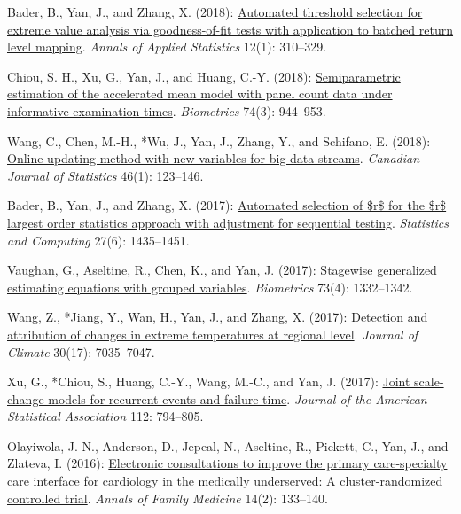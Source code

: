 \begin{RefereedJournalArticles}
\item *Bader, B., Yan, J., and Zhang, X. (2018):
\href{https://doi.org/10.1214/17-AOAS1092}{Automated threshold selection
for extreme value analysis via goodness-of-fit tests with application to
batched return level mapping}. \emph{Annals of Applied Statistics}
12(1): 310--329.

\item *Chiou, S. H., Xu, G., Yan, J., and Huang, C.-Y. (2018):
\href{https://doi.org/10.1111/biom.12840}{Semiparametric estimation of
the accelerated mean model with panel count data under informative
examination times}. \emph{Biometrics} 74(3): 944--953.

\item *Wang, C., Chen, M.-H., *Wu, J., Yan, J., Zhang,
Y., and Schifano, E. (2018):
\href{https://doi.org/10.1002/cjs.11330}{Online updating method with new
variables for big data streams}. \emph{Canadian Journal of Statistics}
46(1): 123--146.

\item *Bader, B., Yan, J., and Zhang, X. (2017):
\href{https://doi.org/10.1007/s11222-016-9697-3}{Automated selection of
\$r\$ for the \$r\$ largest order statistics approach with adjustment
for sequential testing}. \emph{Statistics and Computing} 27(6):
1435--1451.

\item *Vaughan, G., Aseltine, R., Chen, K., and Yan, J. (2017):
\href{https://doi.org/10.1111/biom.12669}{Stagewise generalized
estimating equations with grouped variables}. \emph{Biometrics} 73(4):
1332--1342.

\item *Wang, Z., *Jiang, Y., Wan, H., Yan, J., and
Zhang, X. (2017):
\href{https://doi.org/10.1175/jcli-d-15-0835.1}{Detection and
attribution of changes in extreme temperatures at regional level}.
\emph{Journal of Climate} 30(17): 7035--7047.

\item Xu, G., *Chiou, S., Huang, C.-Y., Wang, M.-C., and Yan, J.
(2017): \href{https://doi.org/10.1080/01621459.2016.1173557}{Joint
scale-change models for recurrent events and failure time}.
\emph{Journal of the American Statistical Association} 112: 794--805.

\item Olayiwola, J. N., Anderson, D., Jepeal, N., Aseltine, R., Pickett, C.,
Yan, J., and Zlateva, I. (2016):
\href{https://doi.org/10.1370/afm.1869}{Electronic consultations to
improve the primary care-specialty care interface for cardiology in the
medically underserved: A cluster-randomized controlled trial}.
\emph{Annals of Family Medicine} 14(2): 133--140.


\end{RefereedJournalArticles}
